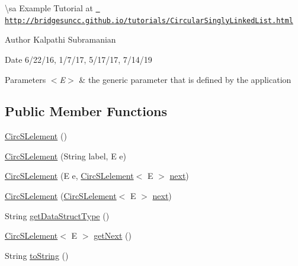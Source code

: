 \textbackslash{}sa Example Tutorial at \href{http://bridgesuncc.github.io/tutorials/CircularSinglyLinkedList.html}{\texttt{ http\+://bridgesuncc.\+github.\+io/tutorials/\+Circular\+Singly\+Linked\+List.\+html}}

\begin{DoxyAuthor}{Author}
Kalpathi Subramanian
\end{DoxyAuthor}
\begin{DoxyDate}{Date}
6/22/16, 1/7/17, 5/17/17, 7/14/19
\end{DoxyDate}

\begin{DoxyParams}{Parameters}
{\em $<$\+E$>$} & the generic parameter that is defined by the application \\
\hline
\end{DoxyParams}
\subsection*{Public Member Functions}
\begin{DoxyCompactItemize}
\item 
\mbox{\hyperlink{classbridges_1_1base_1_1_circ_s_lelement_a4a5a58cc7a0ec5170a828861c11df1b3}{Circ\+S\+Lelement}} ()
\item 
\mbox{\hyperlink{classbridges_1_1base_1_1_circ_s_lelement_a213d61713e51295d756669def911f080}{Circ\+S\+Lelement}} (String label, E e)
\item 
\mbox{\hyperlink{classbridges_1_1base_1_1_circ_s_lelement_ada65c593c8af7e6ed96fcdf12c26824f}{Circ\+S\+Lelement}} (E e, \mbox{\hyperlink{classbridges_1_1base_1_1_circ_s_lelement}{Circ\+S\+Lelement}}$<$ E $>$ \mbox{\hyperlink{classbridges_1_1base_1_1_s_lelement_abf61c96a74ad319d561c6952ea388e0e}{next}})
\item 
\mbox{\hyperlink{classbridges_1_1base_1_1_circ_s_lelement_ab9e5b98e8d917760b9651a52785358b9}{Circ\+S\+Lelement}} (\mbox{\hyperlink{classbridges_1_1base_1_1_circ_s_lelement}{Circ\+S\+Lelement}}$<$ E $>$ \mbox{\hyperlink{classbridges_1_1base_1_1_s_lelement_abf61c96a74ad319d561c6952ea388e0e}{next}})
\item 
String \mbox{\hyperlink{classbridges_1_1base_1_1_circ_s_lelement_ad56acddc52e8e0b6869a6f24f1e0a90e}{get\+Data\+Struct\+Type}} ()
\item 
\mbox{\hyperlink{classbridges_1_1base_1_1_circ_s_lelement}{Circ\+S\+Lelement}}$<$ E $>$ \mbox{\hyperlink{classbridges_1_1base_1_1_circ_s_lelement_ae18b07e3f1d37b5eca0cae22efc0d395}{get\+Next}} ()
\item 
String \mbox{\hyperlink{classbridges_1_1base_1_1_circ_s_lelement_af307188926766e73efb988f102ce9740}{to\+String}} ()
\end{DoxyCompactItemize}
